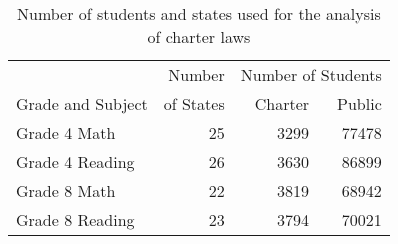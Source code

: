 \begin{table}[t]
\centering
\caption{Number of students and states used for the analysis of charter laws} 
\label{tab:stateNs}
\begin{tabular}{lrrr}
  \hline
& Number & \multicolumn{2}{c}{Number of Students} \\ \cline{3-4}
Grade and Subject & of States & Charter &  Public\\
  \hline
Grade 4 Math &  25 & 3299 & 77478 \\ 
  Grade 4 Reading &  26 & 3630 & 86899 \\ 
  Grade 8 Math &  22 & 3819 & 68942 \\ 
  Grade 8 Reading &  23 & 3794 & 70021 \\ 
   \hline
\end{tabular}
\end{table}
